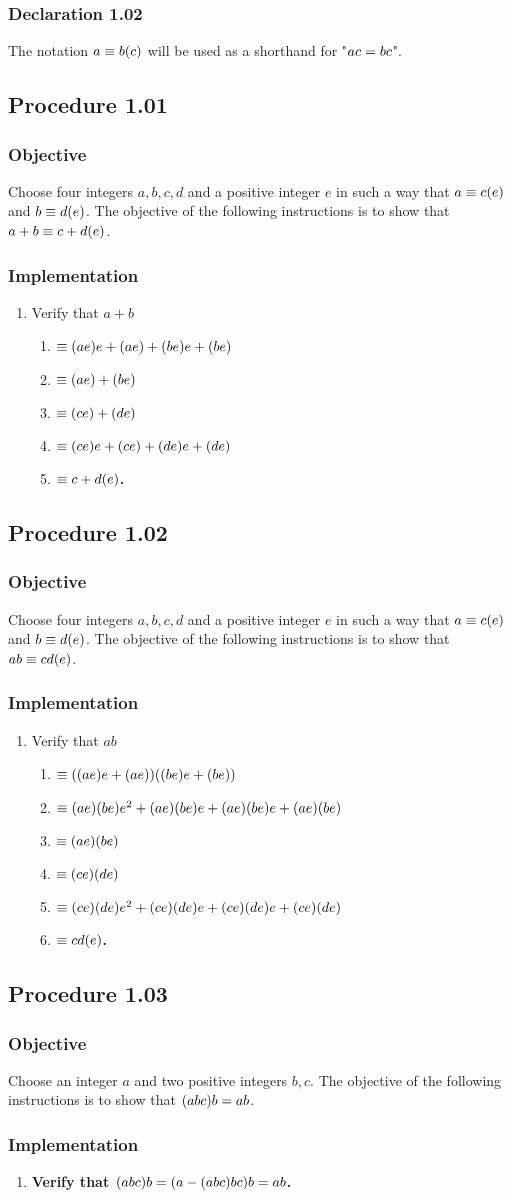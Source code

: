 \documentclass[twocolumn]{article}
\let\div\relax
\DeclareMathOperator{\div}{div}
\let\mod\relax
\DeclareMathOperator{\mod}{mod}
\newcommand{\declaration}[1]{\subsubsection*{Declaration #1}\label{sec:declaration #1}}
\newcommand{\procedure}[2][]{\subsection*{Procedure #2 \ifthenelse{\equal{#1}{}}{}{(#1)}}\label{sec:procedure #2}}
\newcommand{\objective}{\subsubsection*{Objective}}
\newcommand{\implementation}{\subsubsection*{Implementation}}
\begin{document}
		\declaration{1.02}
			The notation $a\equiv b(\mod c)$ will be used as a shorthand for "$a\mod c=b\mod c$".
		\procedure{1.01}
			\objective
				Choose four integers $a,b,c,d$ and a positive integer $e$ in such a way that $a\equiv c(\mod e)$ and $b\equiv d(\mod e)$. The objective of the following instructions is to show that $a+b\equiv c+d(\mod e)$.
			\implementation
				\begin{enumerate}
					\item Verify that $a+b$
					\begin{enumerate}
						\item $\equiv(a\div e)e+(a\mod e)+(b\div e)e+(b\mod e)$
						\item $\equiv(a\mod e)+(b\mod e)$
						\item $\equiv(c\mod e)+(d\mod e)$
						\item $\equiv(c\div e)e+(c\mod e)+(d\div e)e+(d\mod e)$
						\item \textbf{$\equiv c+d(\mod e)$.}
					\end{enumerate}
				\end{enumerate}
		\procedure{1.02}
			\objective
				Choose four integers $a,b,c,d$ and a positive integer $e$ in such a way that $a\equiv c(\mod e)$ and $b\equiv d(\mod e)$. The objective of the following instructions is to show that $ab\equiv cd(\mod e)$.
			\implementation
				\begin{enumerate}
					\item Verify that $ab$
					\begin{enumerate}
						\item $\equiv((a\div e)e+(a\mod e))((b\div e)e+(b\mod e))$
						\item $\equiv(a\div e)(b\div e)e^2+(a\div e)(b\mod e)e+(a\mod e)(b\div e)e+(a\mod e)(b\mod e)$
						\item $\equiv(a\mod e)(b\mod e)$
						\item $\equiv(c\mod e)(d\mod e)$
						\item $\equiv(c\div e)(d\div e)e^2+(c\div e)(d\mod e)e+(c\mod e)(d\div e)e+(c\mod e)(d\mod e)$
						\item \textbf{$\equiv cd(\mod e)$.}
					\end{enumerate}
				\end{enumerate}
		\procedure{1.03}
			\objective
				Choose an integer $a$ and two positive integers $b,c$. The objective of the following instructions is to show that $(a\mod bc)\mod b=a\mod b$.
			\implementation
				\begin{enumerate}
					\item \textbf{Verify that $(a\mod bc)\mod b=(a-(a\div bc)bc)\mod b=a\mod b$.}
				\end{enumerate}
\end{document}
